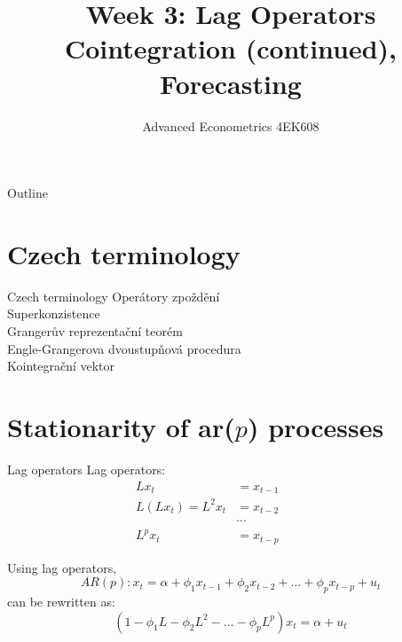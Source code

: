 \documentclass{beamer}
\title[Week1]{Week 3:  Lag Operators \\ Cointegration (continued), Forecasting}
\author{Advanced Econometrics 4EK608}
\institute{Vysoká škola ekonomická v Praze}
\date{}
\begin{document}
 
\begin{frame}
  \titlepage
\end{frame}

\begin{frame}{Outline}
  \tableofcontents
\end{frame}

%
\section{Czech terminology}

\begin{frame}{Czech terminology}
Operátory zpoždění
\\ Superkonzistence
\\ Grangerův reprezentační teorém
\\ Engle-Grangerova dvoustupňová procedura
\\ Kointegrační vektor 
\end{frame}

\section{Stationarity of ar($p$) processes}

\begin{frame}{Lag operators}
Lag operators:
\begin{align*}
Lx_t &= x_{t-1} \\
L(Lx_t)=L^2x_t &= x_{t-2} ~~~~~~~~~~~~~~~~~\\
&\cdots \\
L^p x_t &= x_{t-p} 
\end{align*}

Using lag operators,
$$ AR(p):  x_t = \alpha + \phi_1 x_{t-1} + \phi_2 x_{t-2} +\dots + \phi_p
  x_{t-p}+u_t$$
can be rewritten as: 
$$(1-\phi_1 L - \phi_2 L^2 - \dots - \phi_p L^p)x_t = \alpha + u_t $$

\end{frame}

\end{document}
